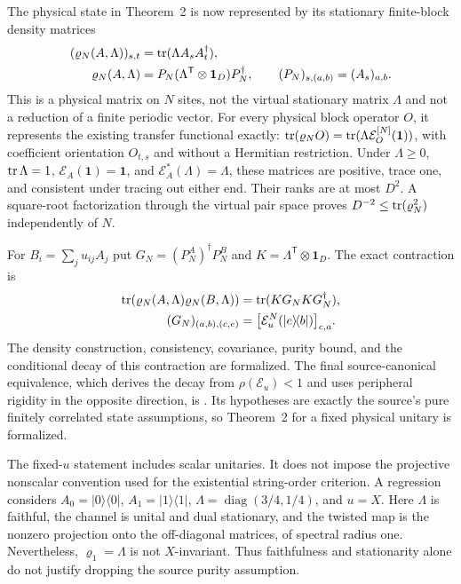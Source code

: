 \documentclass[11pt]{article}
\begin{document}
The physical state in Theorem~2 is now represented by its stationary
finite-block density matrices
\begin{align}
    (\varrho_N(A,\Lambda))_{s,t}
        &=\operatorname{tr}(\Lambda A_sA_t^\dagger),
    \label{eq:pgwsvc08_stationary_physical_density}\\
    \varrho_N(A,\Lambda)
        &=P_N(\Lambda^{\mathsf T}\otimes\mathbf1_D)P_N^\dagger,
    \qquad (P_N)_{s,(a,b)}=(A_s)_{a,b}.
    \label{eq:pgwsvc08_stationary_physical_factorization}
\end{align}
This is a physical matrix on $N$ sites, not the virtual stationary matrix
$\Lambda$ and not a reduction of a finite periodic vector.
For every physical block operator $O$, it represents the existing transfer
functional exactly: $\operatorname{tr}(\varrho_NO)=\operatorname{tr}(\Lambda\mathcal E_O^{[N]}(\mathbf1))$,
with coefficient orientation $O_{t,s}$ and without a Hermitian restriction.
Under $\Lambda\geq0$, $\operatorname{tr}\Lambda=1$, $\mathcal E_A(\mathbf1)=\mathbf1$,
and $\mathcal E_A^*(\Lambda)=\Lambda$, these matrices are positive,
trace one, and consistent under tracing out either end. Their ranks are
at most $D^2$. A square-root factorization through the virtual pair space
proves $D^{-2}\leq\operatorname{tr}(\varrho_N^2)$ independently of $N$.

For $B_i=\sum_j u_{ij}A_j$ put $G_N=(P_N^A)^\dagger P_N^B$ and
$K=\Lambda^{\mathsf T}\otimes\mathbf1_D$. The exact contraction is
\begin{align}
    \operatorname{tr}(\varrho_N(A,\Lambda)\varrho_N(B,\Lambda))
        &=\operatorname{tr}(KG_NKG_N^\dagger),
    \label{eq:pgwsvc08_stationary_physical_overlap}\\
    (G_N)_{(a,b),(c,e)}
        &=\bigl[\mathcal E_u^N(|e\rangle\!\langle b|)\bigr]_{c,a}.
    \label{eq:pgwsvc08_stationary_physical_gram}
\end{align}
The density construction, consistency, covariance, purity bound, and the
conditional decay of this contraction are formalized.
The final source-canonical equivalence, which derives the decay from
$\rho(\mathcal E_u)<1$ and uses peripheral rigidity in the opposite
direction, is
.
Its hypotheses are exactly the source's pure finitely correlated state
assumptions, so Theorem~2 for a fixed physical unitary is formalized.

The fixed-$u$ statement includes scalar unitaries. It does not impose the
projective nonscalar convention used for the existential string-order
criterion. A regression considers $A_0=|0\rangle\langle0|$,
$A_1=|1\rangle\langle1|$, $\Lambda=\operatorname{diag}(3/4,1/4)$,
and $u=X$. Here $\Lambda$ is faithful, the channel is unital and dual
stationary, and the twisted map is the nonzero projection onto the
off-diagonal matrices, of spectral radius one. Nevertheless,
$\varrho_1=\Lambda$ is not $X$-invariant. Thus faithfulness and
stationarity alone do not justify dropping the source purity assumption.
\end{document}
